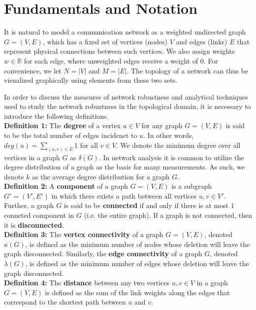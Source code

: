 \documentclass[doc]{apa}%
\begin{document}
\section{Fundamentals and Notation}

It is natural to model a communication network as a weighted undirected graph $G = (V,E)$, which has a fixed set of vertices (nodes) $V$ and edges (links) $E$ that represent physical connections between such vertices. We also assign weights $w \in \mathbb{R}$ for each edge, where unweighted edges receive a weight of $0$. For convenience, we let $N = |V|$ and $M = |E|$. The topology of a network can thus be visualized graphically using elements from these two sets. 

In order to discuss the measures of network robustness and analytical techniques used to study the network robustness in the topological domain, it is necessary to introduce the following definitions. \\

\textbf{Definition 1:}
The \textbf{degree} of a vertex $u \in V$ for any graph $G = (V,E)$ is said to be the total number of edges incidenct to $u$. In other words, $deg(u) = \sum_{(u,v) \in E} 1$ for all $v \in V$. We denote the minimum degree over all vertices in a graph $G$ as $\delta(G)$. In network analysis it is common to utilize the degree distribution of a graph as the basis for many measurements. As such, we denote $k$ as the average degree distribution for a graph $G$.\\

\textbf{Definition 2:}
A \textbf{component} of a graph $G = (V,E)$ is a subgraph $G' = (V',E')$ in which there exists a path between all vertices $u, v \in V'$. Further, a graph $G$ is said to be \textbf{connected} if and only if there is at most $1$ conneted component in $G$ (i.e. the entire graph). If a graph is not connected, then it is \textbf{disconnected}.\\

\textbf{Definition 3:}
The \textbf{vertex connectivity} of a graph $G = (V,E)$, denoted $\kappa(G)$, is defined as the minimum number of nodes whose deletion will leave the graph disconnected. Similarly, the \textbf{edge connectivity} of a graph $G$, denoted $\lambda(G)$, is defined as the minimum number of edges whose deletion will leave the graph disconnected.\\

\textbf{Definition 4:}
The \textbf{distance} between any two vertices $u, v \in V$ in a graph $G = (V,E)$ is defined as the sum of the link weights along the edges that correspond to the shortest path between $u$ and $v$.
\end{document}
